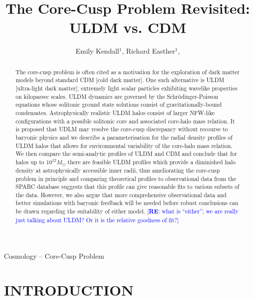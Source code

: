 \documentclass{pasa}%
\title[The Core-Cusp Problem Revisited: ULDM vs. CDM]{The Core-Cusp Problem Revisited: ULDM vs. CDM}
\author[Emily Kendall and Richard Easther]{Emily Kendall$^1$, Richard Easther$^1$, \affil{$^1$Department of Physics, University of Auckland, Private Bag 92019, Auckland, New Zealand}}%
\newcommand{\re}[1]{\textcolor{blue}{[{\bf RE}: #1]}}
\begin{document}
\begin{frontmatter}
\maketitle

\begin{abstract}
The core-cusp problem is often cited as a motivation for the exploration of dark matter models beyond standard CDM [cold dark matter]. One such alternative is ULDM [ultra-light dark matter]; extremely light scalar particles exhibiting wavelike properties on kiloparsec scales. ULDM dynamics are governed by the Schr\"{o}dinger-Poisson equations whose solitonic ground state solutions consist of gravitationally-bound condensates. Astrophysically realistic ULDM halos consist of larger NFW-like configurations with a possible solitonic core and associated core-halo mass relation. It is proposed that UDLM may resolve the core-cusp discrepancy without recourse to baryonic physics and we describe a parameterisation for the radial density profiles of ULDM halos that allows for environmental variability of the core-halo mass relation. We then compare the semi-analytic profiles of ULDM and CDM and conclude that for halos up to $10^{12} M_\odot$ there are feasible ULDM profiles which provide a diminished halo density at astrophysically accessible inner radii, thus ameliorating the core-cusp problem in principle and comparing theoretical profiles to observational data from the SPARC database suggests that this profile can give reasonable fits to various subsets of the data. However, we also  argue that more comprehensive observational data and better simulations with baryonic feedback will be needed before robust conclusions can be drawn regarding the suitability of either model.  \re{what is ``either''; we are really just talking about ULDM? Or it is the relative goodness of fit?}

\end{abstract}

\begin{keywords}
Cosmology -- Core-Cusp Problem 
\end{keywords}
\end{frontmatter}


\section{INTRODUCTION }
\label{sec:intro}
\end{document}

